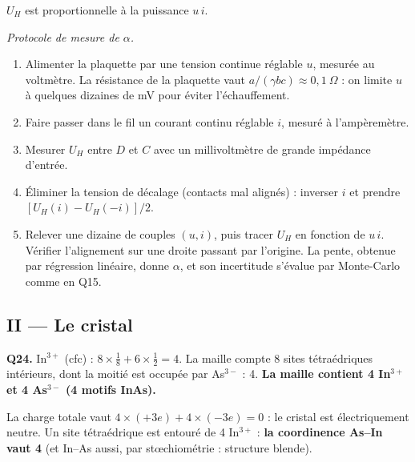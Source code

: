 \documentclass[11pt,a4paper]{article}
\providecommand{\tightlist}{\setlength{\itemsep}{0pt}\setlength{\parskip}{0pt}}
\newcommand{\equationajustee}[1]{%
  \sbox{\boiteequation}{$\displaystyle #1$}%
  \ifdim\wd\boiteequation>\linewidth
    \[\resizebox{\linewidth}{!}{\usebox{\boiteequation}}\]%
  \else
    \[#1\]%
  \fi}
\begin{document}
\equationajustee{\boxed{\alpha=\frac{A_H\mu_0}{\ell_e}=-\frac{\mu_e\,b\,\mu_0}{a\,\ell_e}}}

\equationajustee{\begin{aligned}
\alpha&=\frac{2{,}0\times1{,}26\times10^{-6}}{2\times10^{-3}}\\
&\approx\boxed{1{,}2\times10^{-3}\ \text{A}^{-1}}
\end{aligned}}

\(U_H\) est proportionnelle à la puissance \(u\,i\).

\emph{Protocole de mesure de \(\alpha\).}

\begin{enumerate}
\def\labelenumi{\arabic{enumi}.}
\tightlist
\item
  Alimenter la plaquette par une tension continue réglable \(u\), mesurée au voltmètre. La résistance de la plaquette vaut \(a/(\gamma bc)\approx0{,}1\ \Omega\) : on limite \(u\) à quelques dizaines de mV pour éviter l'échauffement.
\item
  Faire passer dans le fil un courant continu réglable \(i\), mesuré à l'ampèremètre.
\item
  Mesurer \(U_H\) entre \(D\) et \(C\) avec un millivoltmètre de grande impédance d'entrée.
\item
  Éliminer la tension de décalage (contacts mal alignés) : inverser \(i\) et prendre \([U_H(i)-U_H(-i)]/2\).
\item
  Relever une dizaine de couples \((u,i)\), puis tracer \(U_H\) en fonction de \(u\,i\). Vérifier l'alignement sur une droite passant par l'origine. La pente, obtenue par régression linéaire, donne \(\alpha\), et son incertitude s'évalue par Monte-Carlo comme en Q15.
\end{enumerate}

\hypertarget{ii-le-cristal}{%
\subsection{II --- Le cristal}\label{ii-le-cristal}}

\textbf{Q24.} In\(^{3+}\) (cfc) : \(8\times\frac18+6\times\frac12=4\). La maille compte 8 sites tétraédriques intérieurs, dont la moitié est occupée par As\(^{3-}\) : 4. \textbf{La maille contient 4 In\(^{3+}\) et 4 As\(^{3-}\) (4 motifs InAs).}

La charge totale vaut \(4\times(+3e)+4\times(-3e)=0\) : le cristal est électriquement neutre. Un site tétraédrique est entouré de 4 In\(^{3+}\) : \textbf{la coordinence As--In vaut 4} (et In--As aussi, par stœchiométrie : structure blende).
\end{document}
